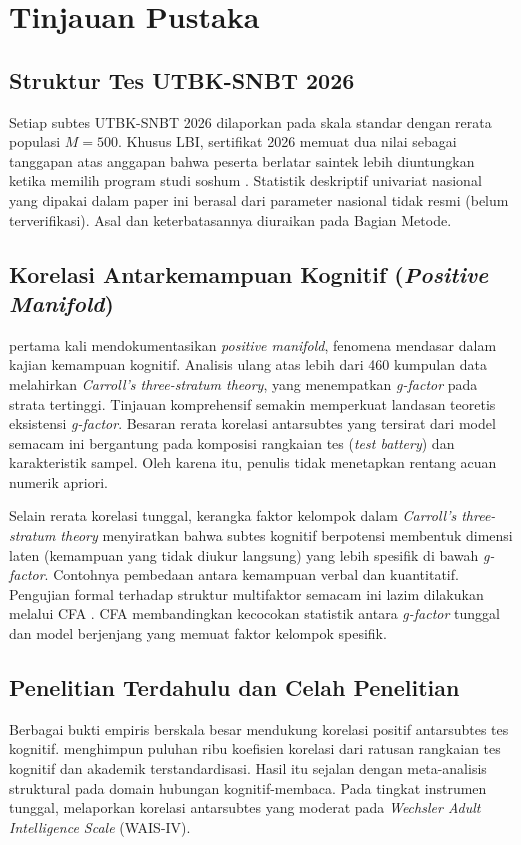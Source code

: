 \section{Tinjauan Pustaka}

\subsection{Struktur Tes UTBK-SNBT 2026}
Setiap subtes UTBK-SNBT 2026 dilaporkan pada skala standar dengan rerata populasi $M = 500$. Khusus LBI, sertifikat 2026 memuat dua nilai sebagai tanggapan atas anggapan bahwa peserta berlatar saintek lebih diuntungkan ketika memilih program studi soshum \autocite{detik2026lbi}. Statistik deskriptif univariat nasional yang dipakai dalam paper ini berasal dari parameter nasional tidak resmi (belum terverifikasi). Asal dan keterbatasannya diuraikan pada Bagian Metode.

\subsection{Korelasi Antarkemampuan Kognitif (\textit{Positive Manifold})}
\textcite{spearman1904} pertama kali mendokumentasikan \textit{positive manifold}, fenomena mendasar dalam kajian kemampuan kognitif. Analisis ulang atas lebih dari 460 kumpulan data \autocite{carroll1993} melahirkan \textit{Carroll's three-stratum theory}, yang menempatkan \textit{g-factor} pada strata tertinggi. Tinjauan komprehensif \textcite{jensen1998} semakin memperkuat landasan teoretis eksistensi \textit{g-factor}. Besaran rerata korelasi antarsubtes yang tersirat dari model semacam ini bergantung pada komposisi rangkaian tes (\textit{test battery}) dan karakteristik sampel. Oleh karena itu, penulis tidak menetapkan rentang acuan numerik apriori.

Selain rerata korelasi tunggal, kerangka faktor kelompok dalam \textit{Carroll's three-stratum theory} \autocite{carroll1993} menyiratkan bahwa subtes kognitif berpotensi membentuk dimensi laten (kemampuan yang tidak diukur langsung) yang lebih spesifik di bawah \textit{g-factor}. Contohnya pembedaan antara kemampuan verbal dan kuantitatif. Pengujian formal terhadap struktur multifaktor semacam ini lazim dilakukan melalui CFA \autocite{brown2015cfa}. CFA membandingkan kecocokan statistik antara \textit{g-factor} tunggal dan model berjenjang yang memuat faktor kelompok spesifik.

\subsection{Penelitian Terdahulu dan Celah Penelitian}
Berbagai bukti empiris berskala besar mendukung korelasi positif antarsubtes tes kognitif. \textcite{jintelligence2026} menghimpun puluhan ribu koefisien korelasi dari ratusan rangkaian tes kognitif dan akademik terstandardisasi. Hasil itu sejalan dengan meta-analisis struktural \textcite{consensusmodel2026} pada domain hubungan kognitif-membaca. Pada tingkat instrumen tunggal, \textcite{waisiv2013} melaporkan korelasi antarsubtes yang moderat pada \textit{Wechsler Adult Intelligence Scale} (WAIS-IV).

